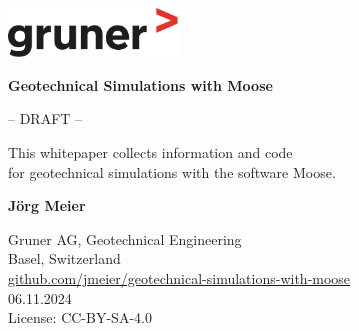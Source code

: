 \begin{titlepage}
    \begin{flushright}
        \includegraphics[width=4.5cm]{img/gruner.pdf}
    \end{flushright}
    \begin{center}
        \vspace*{5cm}

        {\Huge\textbf{Geotechnical Simulations with Moose}}

        \vspace{5cm}

        \large{-- DRAFT --}

        \vfill

        \large{This whitepaper collects information and code \\
            for geotechnical simulations with the software Moose.}

        \vfill

        \textbf{Jörg Meier}

        \vspace{0.8cm}

        Gruner AG, Geotechnical Engineering\\
        Basel, Switzerland\\

        \vspace{1cm}
        \href{https://github.com/jmeier/geotechnical-simulations-with-moose}{github.com/jmeier/geotechnical-simulations-with-moose}\\
        06.11.2024\\

        \vspace{1cm}
        License: CC-BY-SA-4.0

    \end{center}
\end{titlepage}